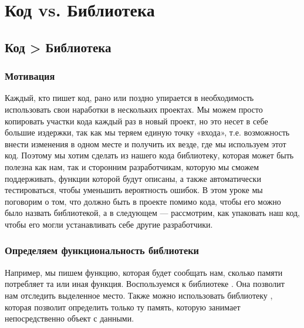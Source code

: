 \documentclass[letterpaper,10pt,russian]{sphinxmanual}
\begin{document}
\chapter{Код vs. Библиотека}
\label{\detokenize{index:vs}}
\sphinxstepscope


\section{Код \sphinxhyphen{}\textgreater{} Библиотека}
\label{\detokenize{educational_materials/code_to_lib/content:id1}}\label{\detokenize{educational_materials/code_to_lib/content::doc}}

\subsection{Мотивация}
\label{\detokenize{educational_materials/code_to_lib/content:id2}}
\sphinxAtStartPar
Каждый, кто пишет код, рано или поздно упирается в необходимость использовать свои наработки в нескольких проектах. Мы можем просто копировать участки кода каждый раз в новый проект, но это несет в себе большие издержки, так как мы теряем единую точку «входа», т.е. возможность внести изменения в одном месте и получить их везде, где мы используем этот код. Поэтому мы хотим сделать из нашего кода библиотеку, которая может быть полезна как нам, так и сторонним разработчикам, которую мы сможем поддерживать, функции которой будут описаны, а также автоматически тестироваться, чтобы уменьшить вероятность ошибок. В этом уроке мы поговорим о том, что должно быть в проекте помимо кода, чтобы его можно было назвать библиотекой, а в следующем — рассмотрим, как упаковать наш код, чтобы его могли устанавливать себе другие разработчики.


\subsection{Определяем функциональность библиотеки}
\label{\detokenize{educational_materials/code_to_lib/content:id3}}
\sphinxAtStartPar
Например, мы пишем функцию, которая будет сообщать нам, сколько памяти потребляет та или иная функция. Воспользуемся  к библиотеке . Она позволит нам отследить выделенное место. Также можно использовать библиотеку , которая позволит определить только ту память, которую занимает непосредственно объект с данными.
\end{document}

